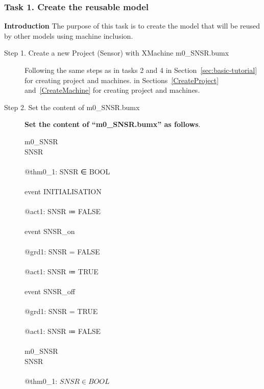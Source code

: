 \subsubsection{Task 1. Create the reusable model}
\textbf{Introduction} The purpose of this task is to create the model that will be reused by other models using machine inclusion.
\begin{description}
\item[Step 1. Create a new Project (Sensor) with XMachine m0\_SNSR.bumx] 

Following the same steps as 
in tasks 2 and 4 in Section~\ref{sec:basic-tutorial} for creating project and machines.
\else
in Sections~\ref{CreateProject} and~\ref{CreateMachine} for creating project and machines.
\endif

\item[Step 2. Set the content of m0\_SNSR.bumx] \textbf{Set the content of ``m0\_SNSR.bumx'' as follows}.
\begin{center}
	\begin{Bcode}
		\Bmachine{} m0_SNSR\\
		\Bvariables{} SNSR\\
		\Binvariants\\
                \Btheorem{} @thm0_1: SNSR ∈ BOOL\\
		\Bevents\\
		event INITIALISATION\\
		\Bthen\\
		@act1: SNSR ≔ FALSE\\
		\Bend\\
		event SNSR_on\\
		\Bwhere\\
		@grd1: SNSR = FALSE\\
		\Bthen\\
		@act1: SNSR ≔ TRUE\\
		\Bend\\
	    event SNSR_off\\
	    \Bwhere\\
	    @grd1: SNSR = TRUE\\
	    \Bthen\\
	    @act1: SNSR ≔ FALSE\\
	    \Bend\\
		\Bend
		\else
		\Bmachine{} m0_SNSR\\
		\Bvariables{} SNSR\\
		\Binvariants\\
		\Btab  \Btheorem{} @thm0_1: \(SNSR \in BOOL\)\\

\end{Bcode}
\end{center}
\end{description}
